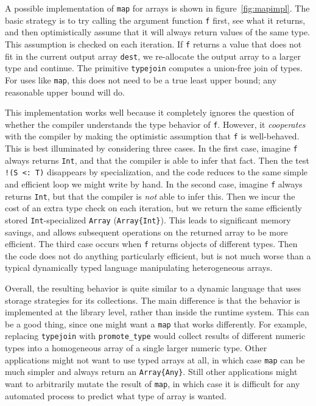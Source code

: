 A possible implementation of \texttt{map} for arrays is shown in
figure~\ref{fig:mapimpl}.
The basic strategy is to try calling the argument function \texttt{f}
first, see what it returns, and then optimistically assume that it
will always return values of the same type.
This assumption is checked on each iteration.
If \texttt{f} returns a value that does not fit in the current output
array \texttt{dest}, we re-allocate the output array to a larger
type and continue.
The primitive \texttt{typejoin} computes a union-free join of types.
For uses like \texttt{map}, this does not need to be a true least
upper bound; any reasonable upper bound will do.

This implementation works well because it completely ignores the
question of whether the compiler understands the type behavior of
\texttt{f}.
However, it \emph{cooperates} with the compiler by making the
optimistic assumption that \texttt{f} is well-behaved.
This is best illuminated by considering three cases.
In the first case, imagine \texttt{f} always returns \texttt{Int},
and that the compiler is able to infer that fact.
Then the test \texttt{!(S <:\ T)} disappears by specialization,
and the code reduces to the same simple and efficient loop we
might write by hand.
In the second case, imagine \texttt{f} always returns \texttt{Int},
but that the compiler is \emph{not} able to infer this.
Then we incur the cost of an extra type check on each iteration,
but we return the same efficiently stored \texttt{Int}-specialized
\texttt{Array} (\texttt{Array\{Int\}}).
This leads to significant memory savings, and allows subsequent
operations on the returned array to be more efficient.
The third case occurs when \texttt{f} returns objects of different
types.
Then the code does not do anything particularly efficient, but is
not much worse than a typical dynamically typed language manipulating
heterogeneous arrays.

Overall, the resulting behavior is quite similar to a dynamic
language that uses storage strategies \cite{Bolz2013} for its
collections.
The main difference is that the behavior is implemented at the
library level, rather than inside the runtime system.
This can be a good thing, since one might want a \texttt{map} that
works differently.
For example, replacing \texttt{typejoin} with \texttt{promote\_type}
would collect results of different numeric types into a
homogeneous array of a single larger numeric type.
Other applications might not want to use typed arrays at all, in
which case \texttt{map} can be much simpler and always return an
\texttt{Array\{Any\}}.
Still other applications might want to arbitrarily mutate the result
of \texttt{map}, in which case it is difficult for any automated
process to predict what type of array is wanted.

